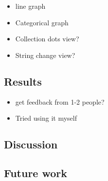 \documentclass{sigchi}
\providecommand{\tightlist}{%
  \setlength{\itemsep}{0pt}\setlength{\parskip}{0pt}}
\begin{document}
\begin{itemize}
\tightlist
\item
  line graph
\item
  Categorical graph
\item
  Collection dots view?
\item
  String change view?
\end{itemize}

\hypertarget{results}{%
\subsection{Results}\label{results}}

\begin{itemize}
\tightlist
\item
  get feedback from 1-2 people?
\item
  Tried using it myself
\end{itemize}

\hypertarget{discussion}{%
\subsection{Discussion}\label{discussion}}

\hypertarget{future-work}{%
\subsection*{Future work}\label{future-work}}

%
%
%
%
%
\balance{}

% 
% 

\printbibliography
\end{document}
